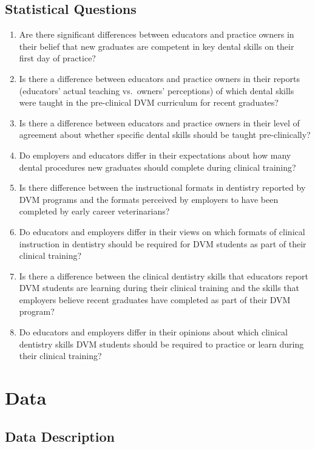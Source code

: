 \documentclass[
  12pt,
  letterpaper,
  DIV=11,
  numbers=noendperiod]{scrartcl}
\numberwithin{figure}{section}
\numberwithin{table}{section}
\begin{document}
\subsection{Statistical Questions}\label{statistical-questions}

\begin{enumerate}
\def\labelenumi{\arabic{enumi}.}
\item
  Are there significant differences between educators and practice
  owners in their belief that new graduates are competent in key dental
  skills on their first day of practice?
\item
  Is there a difference between educators and practice owners in their
  reports (educators' actual teaching vs.~owners' perceptions) of which
  dental skills were taught in the pre-clinical DVM curriculum for
  recent graduates?
\item
  Is there a difference between educators and practice owners in their
  level of agreement about whether specific dental skills should be
  taught pre-clinically?
\item
  Do employers and educators differ in their expectations about how many
  dental procedures new graduates should complete during clinical
  training?
\item
  Is there difference between the instructional formats in dentistry
  reported by DVM programs and the formats perceived by employers to
  have been completed by early career veterinarians?
\item
  Do educators and employers differ in their views on which formats of
  clinical instruction in dentistry should be required for DVM students
  as part of their clinical training?
\item
  Is there a difference between the clinical dentistry skills that
  educators report DVM students are learning during their clinical
  training and the skills that employers believe recent graduates have
  completed as part of their DVM program?
\item
  Do educators and employers differ in their opinions about which
  clinical dentistry skills DVM students should be required to practice
  or learn during their clinical training?
\end{enumerate}

\section{Data}\label{data}

\subsection{Data Description}\label{data-description}
\end{document}
